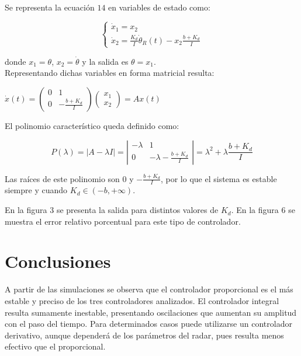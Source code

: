 \documentclass{sig-alternate}
\begin{document}
Se representa la ecuaci\'on $14$ en variables de estado como:

\begin{equation}
\label{var_estados_model3}
\begin{cases} 
    \dot x_1 = x_2 \\
    \dot x_2 = \frac{K_d}{I} \dot\theta_R(t) - x_2 \frac{b+ K_d}{I}
\end{cases}
\end{equation}

donde $x_1 = \theta$, $x_2 = \dot \theta$ y la salida es $\theta=x_1$.\\
Representando dichas variables en forma matricial resulta:

\begin{center}
$
\dot x(t) = 
\left( \begin{array}{ccc}
0 & 1 \\
0 & -\frac{b+K_d}{I}
\end{array} \right)
\left( \begin{array}{c}
x_1 \\
x_2
\end{array} \right)
= Ax(t)
$
\end{center}

El polinomio caracter\'istico queda definido como:

\begin{equation}
 P( \lambda ) = |A - \lambda I| = 
\left| \begin{array}{cc}
- \lambda & 1 \\
0 & - \lambda - \frac{b+K_d}{I}
\end{array} \right| 
=
\lambda^2 + \lambda \frac{b+K_d}{I}
\end{equation}

Las ra\'{i}ces de este polinomio son $0$ y $-\frac{b+K_d}{I}$, por lo que el
sistema es estable siempre y cuando $K_d \in (-b, +\infty)$.

En la figura $3$ se presenta la salida para distintos valores de $K_d$. En la
figura $6$ se muestra el error relativo porcentual para este tipo de controlador.

\section{Conclusiones}\label{conclusiones}
A partir de las simulaciones se observa que el controlador proporcional es el
m\'{a}s estable y preciso de los tres controladores analizados. El
controlador integral resulta sumamente inestable, presentando oscilaciones
que aumentan su amplitud con el paso del tiempo. Para determinados casos puede
utilizarse un controlador derivativo, aunque depender\'{a} de los par\'{a}metros
del radar, pues resulta menos efectivo que el proporcional.
\end{document}
